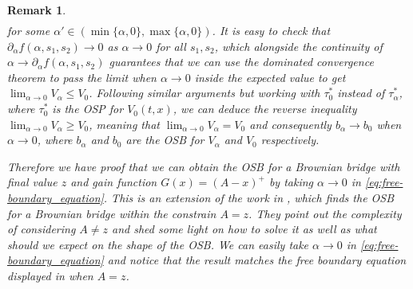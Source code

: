 \documentclass{tufte-handout}
\newtheorem{rmk}{Remark}
\begin{document}
\begin{rmk}
\begin{align*}
		\end{align*} 
		for some $\alpha'\in(\min\{\alpha, 0\}, \max\{\alpha, 0\})$. It is easy to check that $\partial_\alpha f(\alpha, s_1, s_2) \rightarrow 0$ as $\alpha \rightarrow 0$ for all $s_1, s_2$, which alongside the continuity of $\alpha \rightarrow \partial_\alpha f(\alpha, s_1, s_2)$ guarantees that we can use the dominated convergence theorem to pass the limit when $\alpha\rightarrow 0$ inside the expected value to get $\lim_{\alpha\rightarrow 0}V_\alpha \leq V_0$. Following similar arguments but working with $\tau_0^*$ instead of $\tau_\alpha^*$, where $\tau_0^*$ is the OSP for $V_0(t, x)$, we can deduce the reverse inequality $\lim_{\alpha\rightarrow 0}V_\alpha \geq V_0$, meaning that $\lim_{\alpha\rightarrow 0}V_\alpha = V_0$ and consequently $b_ \alpha \rightarrow b_0$ when $\alpha \rightarrow 0$, where $b_ \alpha$ and $b_0$ are the OSB for $V_\alpha$ and $V_0$ respectively.
		
		Therefore we have proof that we can obtain the OSB for a Brownian bridge with final value $z$ and gain function $G(x) = (A - x)^+$ by taking $\alpha \rightarrow 0$ in \eqref{eq:free-boundary_equation}. This is an extension of the work in \citet{d2020discounted}, which finds the OSB for a Brownian bridge within the constrain $A = z$. They point out the complexity of considering $A \neq z$ and shed some light on how to solve it as well as what should we expect on the shape of the OSB. We can easily take $\alpha\rightarrow0$ in \eqref{eq:free-boundary_equation} and notice that the result matches the free boundary equation displayed in \citet{d2020discounted} when $A = z$.  
	\end{rmk}
	
\end{document}
